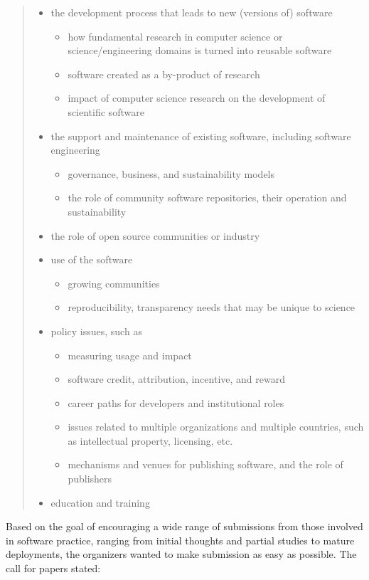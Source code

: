 \documentclass[11pt, oneside]{amsart}
\begin{document}
\begin{quote}
\begin{itemize}
\item the development process that leads to new (versions of) software
\begin{itemize}
\item how fundamental research in computer science or science/engineering domains is turned  into reusable software
\item software created as a by-product of research
\item impact of computer science research on the development of scientific software
\end{itemize}
\item the support and maintenance of existing software, including software engineering
\begin{itemize}
\item governance, business, and sustainability models
\item the role of community software repositories, their operation and sustainability
\end{itemize}
\item the role of open source communities or industry
\item use of the software
\begin{itemize}
\item growing communities
\item reproducibility, transparency needs that may be unique to science
\end{itemize}
\item policy issues, such as
\begin{itemize}
\item measuring usage and impact
\item software credit, attribution, incentive, and reward
\item career paths for developers and institutional roles
\item issues related to multiple organizations and multiple countries, such as intellectual property, licensing, etc.
\item mechanisms and venues for publishing software, and the role of publishers
\end{itemize}
\item education and training
\end{itemize}

\end{quote}

Based on the goal of encouraging a wide range of submissions from those involved in software practice, ranging from initial thoughts and partial studies to mature deployments, the organizers wanted to make submission as easy as possible. The call for papers stated:
\end{document}
